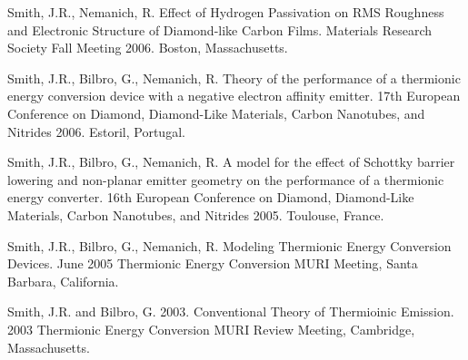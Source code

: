 \documentclass[letterpaper,margin,line]{res}
\begin{document}
\begin{resume}
Smith, J.R., Nemanich, R. Effect of Hydrogen Passivation on RMS Roughness and Electronic Structure of Diamond-like Carbon Films. Materials Research Society Fall Meeting 2006. Boston, Massachusetts.

Smith, J.R., Bilbro, G., Nemanich, R. Theory of the performance of a thermionic energy conversion device with a negative electron affinity emitter. 17th European Conference on Diamond, Diamond-Like Materials, Carbon Nanotubes, and Nitrides 2006. Estoril, Portugal.


Smith, J.R., Bilbro, G., Nemanich, R. A model for the effect of Schottky barrier lowering and non-planar emitter geometry on the performance of a thermionic energy converter. 16th European Conference on Diamond, Diamond-Like Materials, Carbon Nanotubes, and Nitrides 2005. Toulouse, France.

Smith, J.R., Bilbro, G., Nemanich, R. Modeling Thermionic Energy Conversion Devices. June 2005 Thermionic Energy Conversion MURI Meeting, Santa Barbara, California.

Smith, J.R. and Bilbro, G. 2003. Conventional Theory of Thermioinic Emission. 2003 Thermionic Energy Conversion MURI Review Meeting, Cambridge, Massachusetts.


\end{resume}
\end{document}
